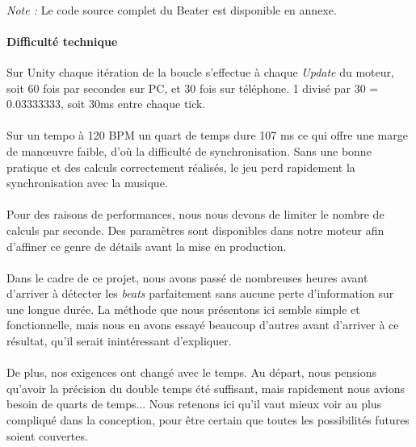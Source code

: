 \paragraph{}
\textit{Note :} Le code source complet du Beater est disponible en annexe.

\paragraph{Difficulté technique}
Sur Unity chaque itération de la boucle s'effectue à chaque \textit{Update} du moteur, soit 60 fois par secondes sur PC, et 30 fois sur téléphone. 1 divisé par 30 = 0.03333333, soit 30ms entre chaque tick.\\\\
Sur un tempo à 120 BPM un quart de temps dure 107 ms ce qui offre une marge de manœuvre faible, d'où la difficulté de synchronisation. Sans une bonne pratique et des calculs correctement réalisés, le jeu perd rapidement la synchronisation avec la musique.\\\\
Pour des raisons de performances, nous nous devons de limiter le nombre de calculs par seconde. Des paramètres sont disponibles dans notre moteur afin d'affiner ce genre de détails avant la mise en production.\\\\
Dans le cadre de ce projet, nous avons passé de nombreuses heures avant d'arriver à détecter les \textit{beats} parfaitement sans aucune perte d'information sur une longue durée. La méthode que nous présentons ici semble simple et fonctionnelle, mais nous en avons essayé beaucoup d'autres avant d'arriver à ce résultat, qu'il serait inintéressant d'expliquer.\\\\
De plus, nos exigences ont changé avec le temps. Au départ, nous pensions qu'avoir la précision du double temps été suffisant, mais rapidement nous avions besoin de quarts de temps... Nous retenons ici qu'il vaut mieux voir au plus compliqué dans la conception, pour être certain que toutes les possibilités futures soient couvertes.


